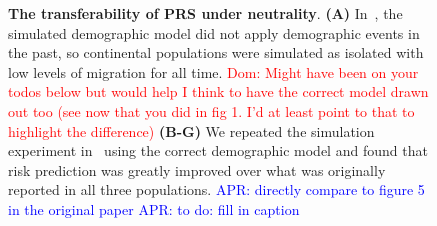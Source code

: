 \documentclass{article}
\newcommand{\aprcomment}[1]{{\textcolor{blue}{APR: #1}}}
\newcommand{\dncomment}[1]{{\textcolor{red}{Dom: #1}}}
\begin{document}
\begin{figure}[ht]
\begin{center}
\caption{\textbf{The transferability of PRS under neutrality}.
    \textbf{(A)} In~\citet{martin2017human}, the simulated demographic model did not apply demographic
    events in the past, so continental populations were simulated as isolated with low levels of migration
    for all time.
    \dncomment{Might have been on your todos below but would help I think to have the correct model
    drawn out too (see now that you did in fig 1. I'd at least point to that to highlight the difference)}
    \textbf{(B-G)} We repeated the simulation experiment in~\cite{martin2017human} using the correct
    demographic model and found that risk prediction was greatly improved over what was originally
    reported in all three populations.
    \aprcomment{directly compare to figure 5 in the original paper}
    \aprcomment{to do: fill in caption}
}
\label{fig:prs}
\end{center}
\end{figure}
\end{document}
